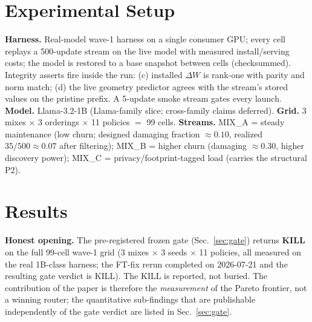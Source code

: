 \documentclass[preprint,12pt]{elsarticle}
\begin{document}
\section{Experimental Setup}
\label{sec:setup}

\textbf{Harness.} Real-model wave-1 harness on a single consumer GPU; every cell
replays a 500-update stream on the live model with measured install/serving costs;
the model is restored to a base snapshot between cells (checksummed). Integrity
asserts fire inside the run: (c) installed $\Delta W$ is rank-one with parity and
norm match; (d) the live geometry predictor agrees with the stream's stored values
on the pristine prefix. A 5-update smoke stream gates every launch.
\textbf{Model.} Llama-3.2-1B (Llama-family slice; cross-family claims deferred).
\textbf{Grid.} 3 mixes $\times$ 3 orderings $\times$ 11 policies $=$ 99 cells.
\textbf{Streams.} MIX\_A = steady maintenance (low churn; designed damaging
fraction $\approx 0.10$, realized $35/500 \approx 0.07$ after filtering); MIX\_B =
higher churn (damaging $\approx 0.30$, higher discovery power); MIX\_C =
privacy/footprint-tagged load (carries the structural P2).

\section{Results}
\label{sec:results}

\textbf{Honest opening.} The pre-registered frozen gate (Sec.~\ref{sec:gate})
returns \textbf{KILL} on the full 99-cell wave-1 grid (3 mixes $\times$ 3 seeds
$\times$ 11 policies, all measured on the real 1B-class harness; the FT-fix rerun
completed on 2026-07-21 and the resulting gate verdict is KILL). The KILL is reported,
not buried. The contribution of the paper is therefore the
\emph{measurement} of the Pareto frontier, not a winning router; the
quantitative sub-findings that are publishable independently of the gate verdict
are listed in Sec.~\ref{sec:gate}.
\end{document}
